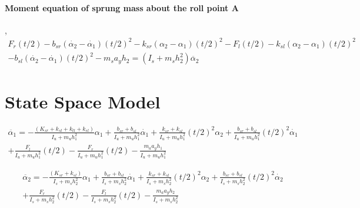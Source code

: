 \documentclass[12pt, a4paper, oneside]{report}
\begin{document}
\paragraph{Moment equation of sprung mass about the roll point A},
\begin{multline}
    F_{r} (t/2) - b_{sr}(\dot{\alpha_2} - \dot{\alpha_1}) (t/2)^2  - k_{sr}(\alpha_2 - \alpha_1) (t/2)^2 - F_{l} (t/2) - k_{sl}(\alpha_2 - \alpha_1) (t/2)^2   \\ 
        - b_{sl}(\dot{\alpha_2} - \dot{\alpha_1})(t/2)^2 - m_s a_y h_2 = (I_s + m_s h_2^2) \ddot{\alpha_2}
\end{multline}

\section{State Space Model}

\begin{multline}
    \ddot{\alpha_1} = -\frac{(K_{sr} + k_{sl} + k_{tl} +k_{sl})}{I_u + m_u h_1^2} \alpha_1 + \frac{b_{sr}+b_{sl}}{I_u + m_u h_1^2} \dot{\alpha_1} + \frac{k_{sr} + k_{sl}}{I_u + m_u h_1^2}(t/2)^2 \alpha_2 + \frac{b_{sr}+b_{sl}}{I_u + m_u h_1^2}(t/2)^2 \dot{\alpha_1}\\
    + \frac{F_l}{I_u + m_u h_1^2}(t/2)- \frac{F_r}{I_u + m_u h_1^2}(t/2) - \frac{m_a a_y h_1}{I_u + m_u h_1^2}
\end{multline}

\begin{multline}
    \ddot{\alpha_2} = -\frac{(K_{sr} + k_{sl})}{I_s + m_s h_2^2} \alpha_1 + \frac{b_{sr}+b_{sl}}{I_s + m_s h_2^2} \dot{\alpha_1} + \frac{k_{sr} + k_{sl}}{I_s + m_s h_2^2}(t/2)^2 \alpha_2 + \frac{b_{sr}+b_{sl}}{I_s + m_s h_2^2}(t/2)^2 \dot{\alpha_2}\\
    + \frac{F_r}{I_s + m_s h_2^2}(t/2)- \frac{F_l}{I_s + m_s h_2^2}(t/2) - \frac{m_a a_y h_2}{I_s + m_s h_2^2}
\end{multline}
\end{document}
